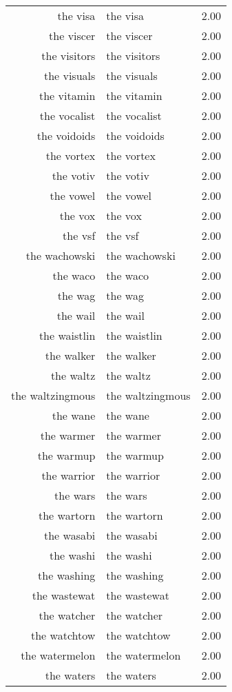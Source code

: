 \begin{table}[ht]
\begin{tabular}{rlr}
  the visa & the visa & 2.00 \\ 
  the viscer & the viscer & 2.00 \\ 
  the visitors & the visitors & 2.00 \\ 
  the visuals & the visuals & 2.00 \\ 
  the vitamin & the vitamin & 2.00 \\ 
  the vocalist & the vocalist & 2.00 \\ 
  the voidoids & the voidoids & 2.00 \\ 
  the vortex & the vortex & 2.00 \\ 
  the votiv & the votiv & 2.00 \\ 
  the vowel & the vowel & 2.00 \\ 
  the vox & the vox & 2.00 \\ 
  the vsf & the vsf & 2.00 \\ 
  the wachowski & the wachowski & 2.00 \\ 
  the waco & the waco & 2.00 \\ 
  the wag & the wag & 2.00 \\ 
  the wail & the wail & 2.00 \\ 
  the waistlin & the waistlin & 2.00 \\ 
  the walker & the walker & 2.00 \\ 
  the waltz & the waltz & 2.00 \\ 
  the waltzingmous & the waltzingmous & 2.00 \\ 
  the wane & the wane & 2.00 \\ 
  the warmer & the warmer & 2.00 \\ 
  the warmup & the warmup & 2.00 \\ 
  the warrior & the warrior & 2.00 \\ 
  the wars & the wars & 2.00 \\ 
  the wartorn & the wartorn & 2.00 \\ 
  the wasabi & the wasabi & 2.00 \\ 
  the washi & the washi & 2.00 \\ 
  the washing & the washing & 2.00 \\ 
  the wastewat & the wastewat & 2.00 \\ 
  the watcher & the watcher & 2.00 \\ 
  the watchtow & the watchtow & 2.00 \\ 
  the watermelon & the watermelon & 2.00 \\ 
  the waters & the waters & 2.00 \\ 

\end{tabular}
\end{table}
